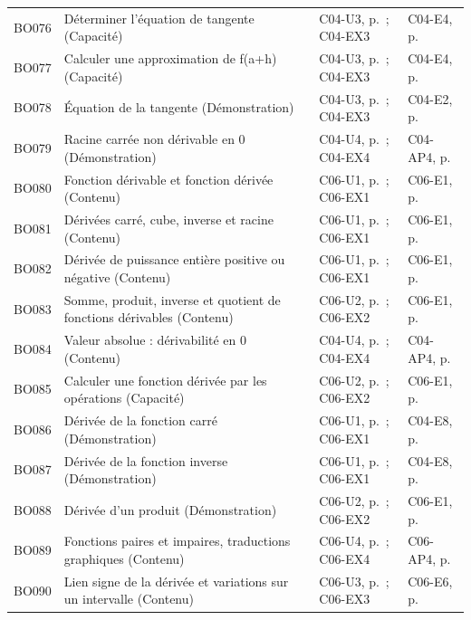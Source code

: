 \begin{longtable}{p{.1\linewidth}p{.43\linewidth}p{.19\linewidth}p{.16\linewidth}}
BO076 & Déterminer l’équation de tangente (Capacité) & C04-U3, p.\,\pageref{C04-U3} ; C04-EX3 & C04-E4, p.\,\pageref{C04-E4} \\
BO077 & Calculer une approximation de f(a+h) (Capacité) & C04-U3, p.\,\pageref{C04-U3} ; C04-EX3 & C04-E4, p.\,\pageref{C04-E4} \\
BO078 & Équation de la tangente (Démonstration) & C04-U3, p.\,\pageref{C04-U3} ; C04-EX3 & C04-E2, p.\,\pageref{C04-E2} \\
BO079 & Racine carrée non dérivable en 0 (Démonstration) & C04-U4, p.\,\pageref{C04-U4} ; C04-EX4 & C04-AP4, p.\,\pageref{C04-AP4} \\
BO080 & Fonction dérivable et fonction dérivée (Contenu) & C06-U1, p.\,\pageref{C06-U1} ; C06-EX1 & C06-E1, p.\,\pageref{C06-E1} \\
BO081 & Dérivées carré, cube, inverse et racine (Contenu) & C06-U1, p.\,\pageref{C06-U1} ; C06-EX1 & C06-E1, p.\,\pageref{C06-E1} \\
BO082 & Dérivée de puissance entière positive ou négative (Contenu) & C06-U1, p.\,\pageref{C06-U1} ; C06-EX1 & C06-E1, p.\,\pageref{C06-E1} \\
BO083 & Somme, produit, inverse et quotient de fonctions dérivables (Contenu) & C06-U2, p.\,\pageref{C06-U2} ; C06-EX2 & C06-E1, p.\,\pageref{C06-E1} \\
BO084 & Valeur absolue : dérivabilité en 0 (Contenu) & C04-U4, p.\,\pageref{C04-U4} ; C04-EX4 & C04-AP4, p.\,\pageref{C04-AP4} \\
BO085 & Calculer une fonction dérivée par les opérations (Capacité) & C06-U2, p.\,\pageref{C06-U2} ; C06-EX2 & C06-E1, p.\,\pageref{C06-E1} \\
BO086 & Dérivée de la fonction carré (Démonstration) & C06-U1, p.\,\pageref{C06-U1} ; C06-EX1 & C04-E8, p.\,\pageref{C04-E8} \\
BO087 & Dérivée de la fonction inverse (Démonstration) & C06-U1, p.\,\pageref{C06-U1} ; C06-EX1 & C04-E8, p.\,\pageref{C04-E8} \\
BO088 & Dérivée d’un produit (Démonstration) & C06-U2, p.\,\pageref{C06-U2} ; C06-EX2 & C06-E1, p.\,\pageref{C06-E1} \\
BO089 & Fonctions paires et impaires, traductions graphiques (Contenu) & C06-U4, p.\,\pageref{C06-U4} ; C06-EX4 & C06-AP4, p.\,\pageref{C06-AP4} \\
BO090 & Lien signe de la dérivée et variations sur un intervalle (Contenu) & C06-U3, p.\,\pageref{C06-U3} ; C06-EX3 & C06-E6, p.\,\pageref{C06-E6} \\

\end{longtable}
